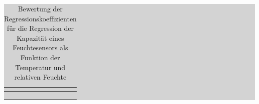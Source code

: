 \begin{table}[H]
\setlength{\arrayrulewidth}{.1em}
\caption{Bewertung der Regressionskoeffizienten f\"{u}r die Regression der Kapazit\"{a}t eines Feuchtesensors als Funktion der Temperatur und relativen Feuchte}
\setlength{\fboxsep}{0pt}%
\colorbox{lightgray}{%
%
\begin{tabular}{| c | c | c | c | c | c |}
\hline
\parbox[c][0.7in][c]{0.95in}{\smallskip\centering\textbf{\selectfont{Name}}} & 
\parbox[c][0.7in][c]{0.95in}{\smallskip\centering\textbf{\selectfont{physikalische \\
Größe}}} & 
\parbox[c][0.7in][c]{0.95in}{\smallskip\centering\textbf{}} & 
\parbox[c][0.7in][c]{0.95in}{\smallskip\centering\textbf{}} & 
\parbox[c][0.7in][c]{0.95in}{\smallskip\centering\textbf{\selectfont{p-Wert}}} & 
\parbox[c][0.7in][c]{0.95in}{\smallskip\centering\textbf{\selectfont{Signifikanz}}}\\ \hline

\parbox[c][0.3in][c]{0.95in}{} &
\parbox[c][0.3in][c]{0.95in}{} &
\parbox[c][0.3in][c]{0.95in}{} &
\parbox[c][0.3in][c]{0.95in}{} &
\parbox[c][0.3in][c]{0.95in}{} &
\parbox[c][0.3in][c]{0.95in}{}\\ \hline

\parbox[c][0.3in][c]{0.95in}{} &
\parbox[c][0.3in][c]{0.95in}{} &
\parbox[c][0.3in][c]{0.95in}{} &
\parbox[c][0.3in][c]{0.95in}{} &
\parbox[c][0.3in][c]{0.95in}{} &
\parbox[c][0.3in][c]{0.95in}{}\\ \hline

\parbox[c][0.3in][c]{0.95in}{} &
\parbox[c][0.3in][c]{0.95in}{} &
\parbox[c][0.3in][c]{0.95in}{} &
\parbox[c][0.3in][c]{0.95in}{} &
\parbox[c][0.3in][c]{0.95in}{} &
\parbox[c][0.3in][c]{0.95in}{}\\ \hline


\end{tabular}}
\end{table}
